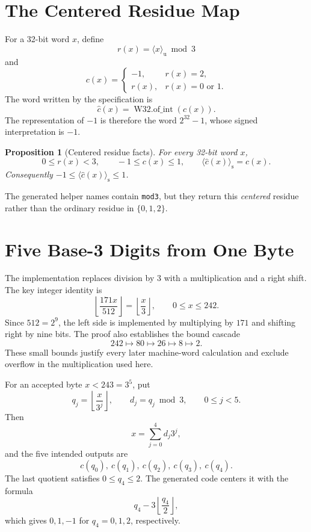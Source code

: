 \documentclass[11pt]{article}
\theoremstyle{definition}
\theoremstyle{plain}
\newtheorem{proposition}{Proposition}
\theoremstyle{remark}
\newcommand{\code}[1]{\nolinkurl{#1}}
\newcommand{\uint}[1]{\langle #1\rangle_{\mathrm u}}
\newcommand{\sint}[1]{\langle #1\rangle_{\mathrm s}}
\begin{document}
\section{The Centered Residue Map}

For a 32-bit word $x$, define
\[
  r(x)=\uint{x}\bmod 3
\]
and
\[
  c(x)=
  \begin{cases}
    -1,&r(x)=2,\\
    r(x),&r(x)=0\text{ or }1.
  \end{cases}
\]
The word written by the specification is
\[
  \widehat c(x)=\operatorname{W32.of\_int}(c(x)).
\]
The representation of $-1$ is therefore the word $2^{32}-1$, whose signed
interpretation is $-1$.

\begin{proposition}[Centered residue facts]
For every 32-bit word $x$,
\[
  0\le r(x)<3,
  \qquad -1\le c(x)\le1,
  \qquad \sint{\widehat c(x)}=c(x).
\]
Consequently $-1\le\sint{\widehat c(x)}\le1$.
\end{proposition}

The generated helper names contain \code{mod3}, but they return this
\emph{centered} residue rather than the ordinary residue in $\{0,1,2\}$.

\section{Five Base-3 Digits from One Byte}

The implementation replaces division by $3$ with a multiplication and a
right shift.  The key integer identity is
\begin{equation}
  \left\lfloor\frac{171x}{512}\right\rfloor
  =\left\lfloor\frac{x}{3}\right\rfloor,
  \qquad 0\le x\le242.
  \label{eq:div3}
\end{equation}
Since $512=2^9$, the left side is implemented by multiplying by $171$ and
shifting right by nine bits.  The proof also establishes the bound cascade
\[
  242\longmapsto80\longmapsto26\longmapsto8\longmapsto2.
\]
These small bounds justify every later machine-word calculation and exclude
overflow in the multiplication used here.

For an accepted byte $x<243=3^5$, put
\[
  q_j=\left\lfloor\frac{x}{3^j}\right\rfloor,
  \qquad
  d_j=q_j\bmod3,
  \qquad 0\le j<5.
\]
Then
\[
  x=\sum_{j=0}^{4}d_j3^j,
\]
and the five intended outputs are
\[
  c(q_0),\ c(q_1),\ c(q_2),\ c(q_3),\ c(q_4).
\]
The last quotient satisfies $0\le q_4\le2$.  The generated code centers it
with the formula
\[
  q_4-3\left\lfloor\frac{q_4}{2}\right\rfloor,
\]
which gives $0,1,-1$ for $q_4=0,1,2$, respectively.
\end{document}
